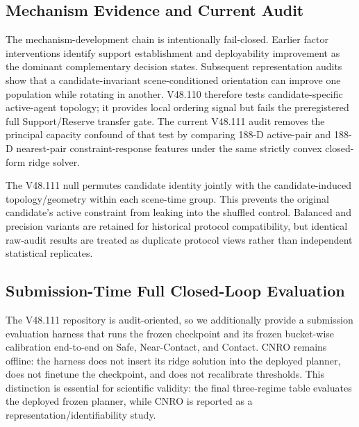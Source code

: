 \documentclass[conference]{IEEEtran}
\begin{document}
\subsection{Mechanism Evidence and Current Audit}
The mechanism-development chain is intentionally fail-closed. Earlier factor interventions identify support establishment and deployability improvement as the dominant complementary decision states. Subsequent representation audits show that a candidate-invariant scene-conditioned orientation can improve one population while rotating in another. V48.110 therefore tests candidate-specific active-agent topology; it provides local ordering signal but fails the preregistered full Support/Reserve transfer gate. The current V48.111 audit removes the principal capacity confound of that test by comparing 188-D active-pair and 188-D nearest-pair constraint-response features under the same strictly convex closed-form ridge solver.

The V48.111 null permutes candidate identity jointly with the candidate-induced topology/geometry within each scene-time group. This prevents the original candidate's active constraint from leaking into the shuffled control. Balanced and precision variants are retained for historical protocol compatibility, but identical raw-audit results are treated as duplicate protocol views rather than independent statistical replicates.

\subsection{Submission-Time Full Closed-Loop Evaluation}
The V48.111 repository is audit-oriented, so we additionally provide a submission evaluation harness that runs the frozen checkpoint and its frozen bucket-wise calibration end-to-end on Safe, Near-Contact, and Contact. CNRO remains offline: the harness does not insert its ridge solution into the deployed planner, does not finetune the checkpoint, and does not recalibrate thresholds. This distinction is essential for scientific validity: the final three-regime table evaluates the deployed frozen planner, while CNRO is reported as a representation/identifiability study.
\end{document}
